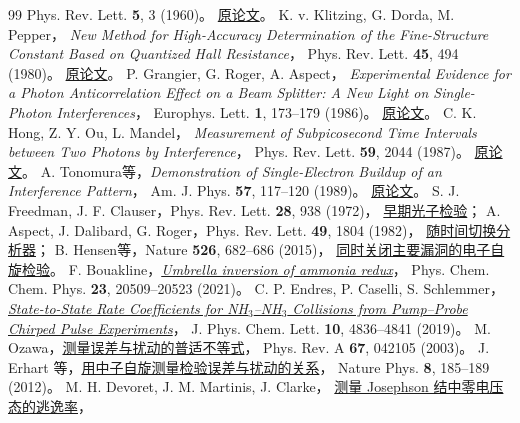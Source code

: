 \begin{thebibliography}{99}
    Phys. Rev. Lett. \textbf{5}, 3 (1960)。
    \href{https://doi.org/10.1103/PhysRevLett.5.3}{原论文}。
    K. v. Klitzing, G. Dorda, M. Pepper，
    \textit{New Method for High-Accuracy Determination of the Fine-Structure Constant Based on Quantized Hall Resistance}，
    Phys. Rev. Lett. \textbf{45}, 494 (1980)。
    \href{https://doi.org/10.1103/PhysRevLett.45.494}{原论文}。
    P. Grangier, G. Roger, A. Aspect，
    \textit{Experimental Evidence for a Photon Anticorrelation Effect on a Beam Splitter: A New Light on Single-Photon Interferences}，
    Europhys. Lett. \textbf{1}, 173--179 (1986)。
    \href{https://doi.org/10.1209/0295-5075/1/4/004}{原论文}。
    C. K. Hong, Z. Y. Ou, L. Mandel，
    \textit{Measurement of Subpicosecond Time Intervals between Two Photons by Interference}，
    Phys. Rev. Lett. \textbf{59}, 2044 (1987)。
    \href{https://doi.org/10.1103/PhysRevLett.59.2044}{原论文}。
    A. Tonomura等，\textit{Demonstration of Single-Electron Buildup of an Interference Pattern}，
    Am. J. Phys. \textbf{57}, 117--120 (1989)。
    \href{https://doi.org/10.1119/1.16104}{原论文}。
    S. J. Freedman, J. F. Clauser，Phys. Rev. Lett. \textbf{28}, 938 (1972)，
    \href{https://doi.org/10.1103/PhysRevLett.28.938}{早期光子检验}；
    A. Aspect, J. Dalibard, G. Roger，Phys. Rev. Lett. \textbf{49}, 1804 (1982)，
    \href{https://doi.org/10.1103/PhysRevLett.49.1804}{随时间切换分析器}；
    B. Hensen等，Nature \textbf{526}, 682--686 (2015)，
    \href{https://doi.org/10.1038/nature15759}{同时关闭主要漏洞的电子自旋检验}。
    F. Bouakline，\href{https://doi.org/10.1039/D1CP01991K}{\textit{Umbrella inversion of ammonia redux}}，
    Phys. Chem. Chem. Phys. \textbf{23}, 20509--20523 (2021)。
    C. P. Endres, P. Caselli, S. Schlemmer，
    \href{https://doi.org/10.1021/acs.jpclett.9b01653}{\textit{State-to-State Rate Coefficients for NH$_3$--NH$_3$ Collisions from Pump--Probe Chirped Pulse Experiments}}，
    J. Phys. Chem. Lett. \textbf{10}, 4836--4841 (2019)。
    M. Ozawa，\href{https://doi.org/10.1103/PhysRevA.67.042105}{测量误差与扰动的普适不等式}，
    Phys. Rev. A \textbf{67}, 042105 (2003)。
    J. Erhart 等，\href{https://doi.org/10.1038/nphys2194}{用中子自旋测量检验误差与扰动的关系}，
    Nature Phys. \textbf{8}, 185--189 (2012)。
    M. H. Devoret, J. M. Martinis, J. Clarke，
    \href{https://doi.org/10.1103/PhysRevLett.55.1908}{测量 Josephson 结中零电压态的逃逸率}，

\end{thebibliography}
